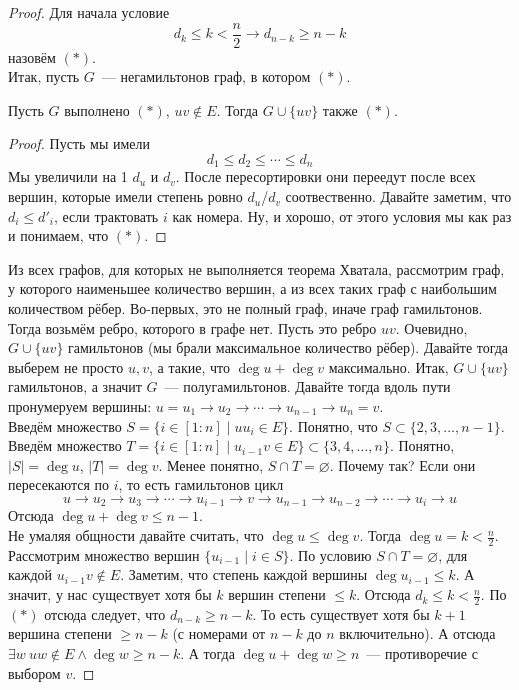 \documentclass{article}
\begin{document}
    \begin{proof}
        Для начала условие
        $$
        d_k\leqslant k<\frac n2\rightarrow d_{n-k}\geqslant n-k
        $$
        назовём $(*)$.\\
        Итак, пусть $G$~--- негамильтонов граф, в котором $(*)$.
        \begin{lemma}
            Пусть $G$ выполнено $(*)$, $uv\notin E$. Тогда $G\cup\{uv\}$ также $(*)$.
        \end{lemma}
        \begin{proof}
            Пусть мы имели
            $$d_1\leqslant d_2\leqslant\cdots\leqslant d_n$$
            Мы увеличили на 1 $d_u$ и $d_v$. После пересортировки они переедут после всех вершин, которые имели степень ровно $d_u$/$d_v$ соотвественно. Давайте заметим, что $d_i\leqslant d'_i$, если трактовать $i$ как номера. Ну, и хорошо, от этого условия мы как раз и понимаем, что $(*)$.
        \end{proof}
        Из всех графов, для которых не выполняется теорема Хватала, рассмотрим граф, у которого наименьшее количество вершин, а из всех таких граф с наибольшим количеством рёбер. Во-первых, это не полный граф, иначе граф гамильтонов. Тогда возьмём ребро, которого в графе нет. Пусть это ребро $uv$. Очевидно, $G\cup\{uv\}$ гамильтонов (мы брали максимальное количество рёбер). Давайте тогда выберем не просто $u,v$, а такие, что $\deg u+\deg v$ максимально. Итак, $G\cup\{uv\}$ гамильтонов, а значит $G$~--- полугамильтонов. Давайте тогда вдоль пути пронумеруем вершины: $u=u_1\to u_2\to\cdots\to u_{n-1}\to u_n=v$.\\
        Введём множество $S=\{i\in[1:n]\mid uu_i\in E\}$. Понятно, что $S\subset\{2,3,\ldots,n-1\}$. Введём множество $T=\{i\in[1:n]\mid u_{i-1}v\in E\}\subset\{3,4,\ldots,n\}$. Понятно, $|S|=\deg u$, $|T|=\deg v$. Менее понятно, $S\cap T=\varnothing$. Почему так? Если они пересекаются по $i$, то есть гамильтонов цикл
        $$u\to u_2\to u_3\to\cdots\to u_{i-1}\to v\to u_{n-1}\to u_{n-2}\to\cdots\to u_i\to u$$
        Отсюда $\deg u+\deg v\leqslant n-1$.\\
        Не умаляя общности давайте считать, что $\deg u\leqslant\deg v$. Тогда $\deg u=k<\frac n2$. Рассмотрим множество вершин $\{u_{i-1}\mid i\in S\}$. По условию $S\cap T=\varnothing$, для каждой $u_{i-1}v\notin E$. Заметим, что степень каждой вершины $\deg u_{i-1}\leqslant k$. А значит, у нас существует хотя бы $k$ вершин степени $\leqslant k$. Отсюда $d_k\leqslant k<\frac n2$. По $(*)$ отсюда следует, что $d_{n-k}\geqslant n-k$. То есть существует хотя бы $k+1$ вершина степени $\geqslant n-k$ (с номерами от $n-k$ до $n$ включительно). А отсюда $\exists w~uw\notin E\land\deg w\geqslant n-k$. А тогда $\deg u+\deg w\geqslant n$~--- противоречие с выбором $v$.
    \end{proof}
\end{document}

